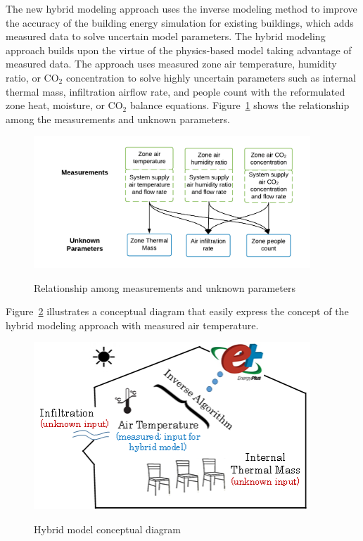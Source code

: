 The new hybrid modeling approach uses the inverse modeling method to improve the accuracy of the building energy simulation for existing buildings, which adds measured data to solve uncertain model parameters. The hybrid modeling approach builds upon the virtue of the physics-based model taking advantage of measured data. The approach uses measured zone air temperature, humidity ratio, or CO$_2$ concentration to solve highly uncertain parameters such as internal thermal mass, infiltration airflow rate, and people count with the reformulated zone heat, moisture, or CO$_2$ balance equations. Figure~\ref{fig:hybrid-model-solution-diagram} shows the relationship among the measurements and unknown parameters. 

\begin{figure}[h]
\begin{center}
\includegraphics[width=295pt]{media/img_HybridModel-0.png}
\caption{Relationship among measurements and unknown parameters}\protect \label{fig:hybrid-model-solution-diagram}
\end{center}
\end{figure}


Figure~\ref{fig:hybrid-model-conceptual-diagram} illustrates a conceptual diagram that easily express the concept of the hybrid modeling approach with measured air temperature. 

\begin{figure}[h]
\begin{center}
\includegraphics[width=295pt]{media/img_HybridModel-1.png}
\caption{Hybrid model conceptual diagram}\protect \label{fig:hybrid-model-conceptual-diagram}
\end{center}
\end{figure}



